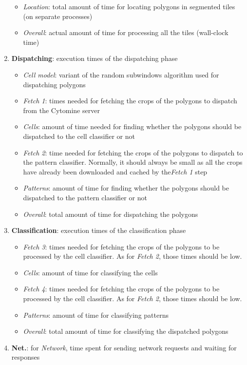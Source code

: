 \begin{enumerate}
\begin{itemize}
		\item \textit{Location}: total amount of time for locating polygons in segmented tiles (on separate processes)
		\item \textit{Overall}: actual amount of time for processing all the tiles (wall-clock time)
	\end{itemize}
	\item \textbf{Dispatching}: execution times of the dispatching phase
	\begin{itemize}
		\item \textit{Cell model}: variant of the random subwindows algorithm used for dispatching polygons
		\item \textit{Fetch 1}: times needed for fetching the crops of the polygons to dispatch from the Cytomine server
		\item \textit{Cells}: amount of time needed for finding whether the polygons should be dispatched to the cell classifier or not
		\item \textit{Fetch 2}: time needed for fetching the crops of the polygons to dispatch to the pattern classifier. Normally, it should always be small as all the crops have already been downloaded and cached by the\textit{Fetch 1} step
		\item \textit{Patterns}: amount of time for finding whether the polygons should be dispatched to the pattern classifier or not
		\item \textit{Overall}: total amount of time for dispatching the polygons 
	\end{itemize}
	\item \textbf{Classification}: execution times of the classification phase
	\begin{itemize}
		\item \textit{Fetch 3}: times needed for fetching the crops of the polygons to be processed by the cell classifier. As for \textit{Fetch 2}, those times should be low. 
		\item \textit{Cells}: amount of time for classifying the cells 
		\item \textit{Fetch 4}: times needed for fetching the crops of the polygons to be processed by the cell classifier. As for \textit{Fetch 2}, those times should be low.
		\item \textit{Patterns}: amount of time for classifying patterns
		\item \textit{Overall}: total amount of time for classifying the dispatched polygons
	\end{itemize}
	\item \textbf{Net.}: for \textit{Network}, time spent for sending network requests and waiting for responses

\end{enumerate}
